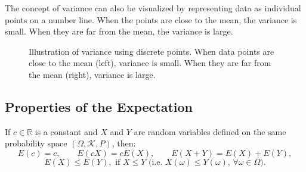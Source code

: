 \documentclass[12pt]{article}
\begin{document}
The concept of variance can also be visualized by representing data as individual points on a number line.  
When the points are close to the mean, the variance is small.  
When they are far from the mean, the variance is large.

\begin{figure}[H]
\centering
\begin{minipage}{0.48\textwidth}
\centering
{}
\end{minipage}
\hfill
\begin{minipage}{0.48\textwidth}
\centering
{}
\end{minipage}
\caption{Illustration of variance using discrete points. 
When data points are close to the mean (left), variance is small. 
When they are far from the mean (right), variance is large.}
\end{figure}








\subsection{Properties of the Expectation}

If $c \in \mathbb{R}$ is a constant and $X$ and $Y$ are random variables defined on the same probability space $(\Omega, \mathcal{K}, P)$, then:
\[
E(c) = c, \qquad
E(cX) = cE(X), \qquad
E(X + Y) = E(X) + E(Y),
\]
\[
E(X) \le E(Y), \text{ if } X \le Y \text{ (i.e. } X(\omega) \le Y(\omega), \, \forall \omega \in \Omega).
\]
\end{document}
